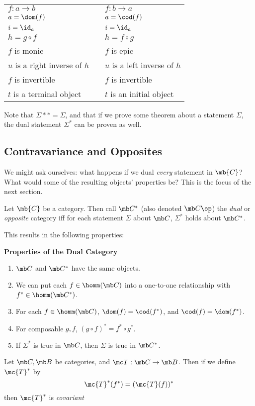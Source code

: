 \documentclass[nocover]{pset}
\begin{document}
\begin{adjustwidth}{1em}{1em}
\begin{definition}[Duality]
\begin{table}[H]
\begin{tabular}{@{}lll@{}}
        $f : a \to b$ && $f : b \to a$  \\
        $a = \dom(f)$ && $a = \cod(f)$ \\
        $i = \id_a$ && $i = \id_a$ \\
        $h = g \circ f$ && $h = f \circ g$ \\
        $f$ is monic && $f$ is epic \\
        $u$ is a right inverse of $h$ && $u$ is a left inverse of $h$
        \\
        $f$ is invertible && $f$ is invertible \\
        $t$ is a terminal object && $t$ is an initial object\\
        \bottomrule
      \end{tabular}
    \end{table}
  \end{definition}
  Note that $\Sigma** = \Sigma$, and that if we prove some theorem
  about a statement $\Sigma$, the dual statement $\Sigma^*$ can be
  proven as well.
  \subsection{Contravariance and Opposites}
  We might ask ourselves: what happens if we dual \emph{every}
  statement in $\mb{C}$? What would some of the resulting objects'
  properties be? This is the focus of the next section.
  \begin{definition}
    Let $\mb{C}$ be a category. Then call $\mb C^*$ (also denoted
    $\mb C\op$) the \emph{dual} or \emph{opposite} category iff for
    each statement $\Sigma$ about $\mb C$, $\Sigma^*$ holds about $\mb
    C^*$.
  \end{definition}
  This results in the following properties:
  \begin{leftbar}
    {\large \bfseries Properties of the Dual Category}
    \begin{enumerate}[label=\arabic*)]
      \item $\mb C$ and $\mb C^*$ have the same objects.
      \item We can put each $f \in \homm(\mb C)$ into a one-to-one
        relationship with $f^* \in \homm(\mb C^*)$.
      \item For each $f \in \homm(\mb C)$, $\dom(f) = \cod(f^*)$, and
        $\cod(f) = \dom(f^*)$.
      \item For composable $g,f$, $(g \circ f)^* = f^* \circ g^*$.
      \item If $\Sigma^*$ is true in $\mb C$, then $\Sigma$ is true in
        $\mb C^*$.
    \end{enumerate}
  \end{leftbar}
  \begin{theorem}
    Let $\mb C, \mb B$ be categories, and $\mc T : \mb C \to \mb B$.
    Then if we define $\mc{T}^*$ by
    \[
      \mc{T}^*(f^*) = (\mc{T} (f))^*
    \]
    then $\mc{T}^*$ is \emph{covariant}
  \end{theorem}

\end{adjustwidth}
\end{document}
